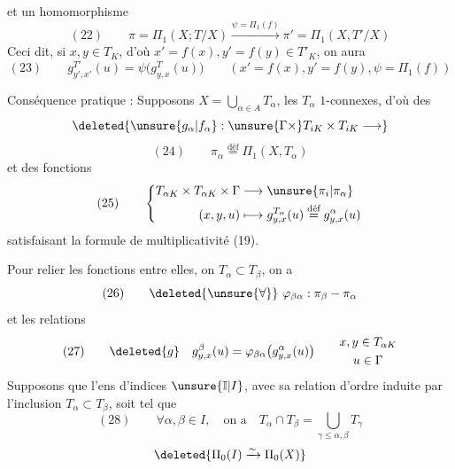et un homomorphisme
\[
(22)\qquad\pi=\Pi_1(X;T/X)\overset{\psi=\Pi_1(f)}{\longrightarrow}\pi'=\Pi_1(X,T'/X)
\]
Ceci dit, si $x,y\in T_K$, d'où $x'=f(x),y'=f(y)\in T'_K$, on aura
\[
(23)\qquad g_{y',x'}^{T'}(u)=\psi\bigl(g_{y,x}^T(u)\bigr)
\qquad(x'=f(x),y'=f(y),\psi=\Pi_1(f))
\]

Conséquence pratique : Supposons $X=\bigcup_{\alpha\in A}T_\alpha$, les $T_\alpha$ $1$-connexes, d'où des  
\[
\deleted{\unsure{g_\alpha|f_\alpha}:\unsure{\Gamma\times}T_{iK}\times T_{iK}\longrightarrow}
\]
\[
(24)\qquad \pi_\alpha\overset{\text{déf}}{=}\Pi_1(X,T_\alpha)
\]
et des fonctions
\[
(25)\qquad\left\{\begin{aligned}
T_{\alpha K}\times T_{\alpha K}\times\Gamma&\longrightarrow\unsure{\pi_i|\pi_\alpha}\\
(x,y,u)&\longmapsto g_{y,x}^{T_\alpha}(u)\overset{\text{déf}}{=}g_{y,x}^{\alpha}(u)
\end{aligned}\right.
\]
satisfaisant la formule de multiplicativité (19).

Pour relier les fonctions entre elles,  on   $T_\alpha\subset T_\beta$, on a
\[
(26)\qquad\deleted{\unsure{\forall}}\ \varphi_{\beta\alpha}:\pi_\beta\mathbin{-}\pi_\alpha
\]
et les relations
\[
(27)\qquad\deleted{g}\quad g_{y,x}^{\beta}(u)=\varphi_{\beta\alpha}\bigl(g_{y,x}^{\alpha}(u)\bigr)\qquad\begin{gathered}x,y\in T_{\alpha K}\\u\in\Gamma\end{gathered}
\]
Supposons que l'ens d'indices $\unsure{\mathbb{I}|I}$, avec sa relation d'ordre induite par l'inclusion $T_\alpha\subset T_\beta$, soit tel que 
\[
(28)\qquad\forall\alpha,\beta\in I,\quad\text{on a}\quad T_\alpha\cap T_\beta=\bigcup_{\gamma\le\alpha,\beta}T_\gamma
\]
\[
\deleted{\Pi_0(I)\xrightarrow{\sim}\Pi_0(X)}
\]
